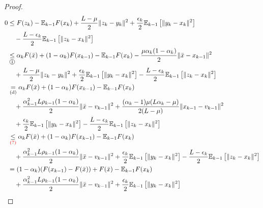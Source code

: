 \documentclass[12pt]{article}
\newcommand{\expect}{\ensuremath{\mathbb E}}
\begin{document}
\begin{proof}
        {\allowdisplaybreaks
        \begin{align*}
            0 &\le 
            F(z_k) - \expect_{k - 1} F(x_k) 
            + \frac{L - \mu}{2}\Vert z_k - y_k\Vert^2 
            + \frac{\epsilon_k}{2}\expect_{k - 1} \left[\Vert y_k - x_k \Vert^2\right] 
                \\&\quad
                - \frac{L - \epsilon_k}{2}\expect_{k - 1} \left[\Vert z_k - x_k\Vert^2\right]
            \\
            &\underset{\circled{1}}{\le} 
            \alpha_k F(\bar x) + (1 - \alpha_k)F(x_{k - 1}) - \expect_{k - 1} F(x_k) - \frac{\mu\alpha_k(1 - \alpha_k)}{2}\Vert \bar x - x_{k - 1}\Vert^2
                \\&\quad 
                + \frac{L - \mu}{2}\Vert z_k - y_k\Vert^2 
                + \frac{\epsilon_k}{2}\expect_{k - 1} \left[\Vert y_k - x_k \Vert^2\right] 
                - \frac{L - \epsilon_k}{2}\expect_{k - 1} \left[\Vert z_k - x_k\Vert^2\right]
            \\
            &\underset{\text{(d)}}{=}
            \alpha_k F(\bar x) + (1 - \alpha_k)F(x_{k - 1}) - \expect_{k - 1} F(x_k) 
                \\&\quad 
                + \frac{\alpha_{k - 1}^2L \rho_{k - 1}(1 - \alpha_k)}{2}\Vert \bar x - v_{k - 1}\Vert^2
                + \frac{(\alpha_k - 1)\mu(L\alpha_k - \mu)}{2(L - \mu)}\Vert x_{k - 1} - v_{k - 1}\Vert^2
                \\&\quad 
                + \frac{\epsilon_k}{2}\expect_{k - 1} \left[\Vert y_k - x_k \Vert^2\right] 
                - \frac{L - \epsilon_k}{2}\expect_{k - 1} \left[\Vert z_k - x_k\Vert^2\right]
            \\&\underset{\textcolor{red}{(?)}}{\le}
            \alpha_k F(\bar x) + (1 - \alpha_k)F(x_{k - 1}) - \expect_{k - 1} F(x_k) 
                \\&\quad 
                + \frac{\alpha_{k - 1}^2L \rho_{k - 1}(1 - \alpha_k)}{2}\Vert \bar x - v_{k - 1}\Vert^2
                + \frac{\epsilon_k}{2}\expect_{k - 1} \left[\Vert y_k - x_k \Vert^2\right] 
                - \frac{L - \epsilon_k}{2}\expect_{k - 1} \left[\Vert z_k - x_k\Vert^2\right]
            \\&= 
            (1 - \alpha_k)(F(x_{k - 1}) - F(\bar x)) + F(\bar x) - \expect_{k - 1}F(x_k)
            \\&\quad 
                + \frac{\alpha_{k - 1}^2L \rho_{k - 1}(1 - \alpha_k)}{2}\Vert \bar x - v_{k - 1}\Vert^2
                + \frac{\epsilon_k}{2}\expect_{k - 1} \left[\Vert y_k - x_k \Vert^2\right] 

\end{align*}}
\end{proof}
\end{document}
